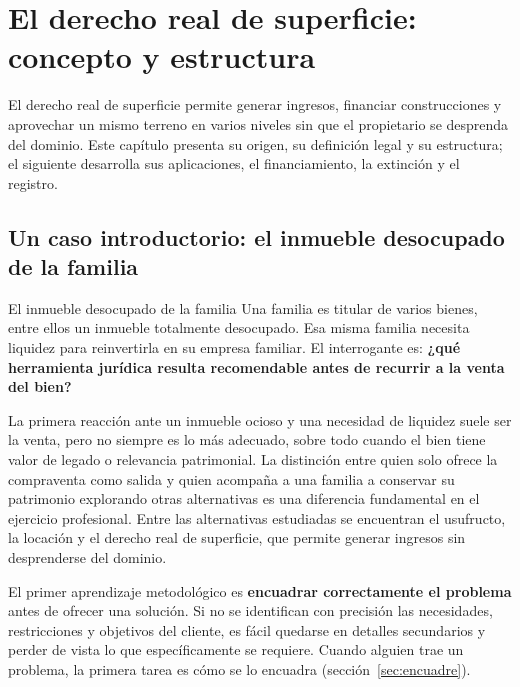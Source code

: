 \documentclass[12pt,oneside]{book}
\begin{document}
\chapter{El derecho real de superficie: concepto y estructura}
\label{cap:superficie}

El derecho real de superficie permite generar ingresos, financiar construcciones y aprovechar un mismo terreno en varios niveles sin que el propietario se desprenda del dominio. Este capítulo presenta su origen, su definición legal y su estructura; el siguiente desarrolla sus aplicaciones, el financiamiento, la extinción y el registro.

\section{Un caso introductorio: el inmueble desocupado de la familia}

\begin{example}{El inmueble desocupado de la familia}
Una familia es titular de varios bienes, entre ellos un inmueble totalmente desocupado. Esa misma familia necesita liquidez para reinvertirla en su empresa familiar. El interrogante es: \textbf{¿qué herramienta jurídica resulta recomendable antes de recurrir a la venta del bien?}
\end{example}

La primera reacción ante un inmueble ocioso y una necesidad de liquidez suele ser la venta, pero no siempre es lo más adecuado, sobre todo cuando el bien tiene valor de legado o relevancia patrimonial. La distinción entre quien solo ofrece la compraventa como salida y quien acompaña a una familia a conservar su patrimonio explorando otras alternativas es una diferencia fundamental en el ejercicio profesional. Entre las alternativas estudiadas se encuentran el usufructo, la locación y el derecho real de superficie, que permite generar ingresos sin desprenderse del dominio.

\begin{important}
El primer aprendizaje metodológico es \textbf{encuadrar correctamente el problema} antes de ofrecer una solución. Si no se identifican con precisión las necesidades, restricciones y objetivos del cliente, es fácil quedarse en detalles secundarios y perder de vista lo que específicamente se requiere. Cuando alguien trae un problema, la primera tarea es cómo se lo encuadra (sección~\ref{sec:encuadre}).
\end{important}
\end{document}
